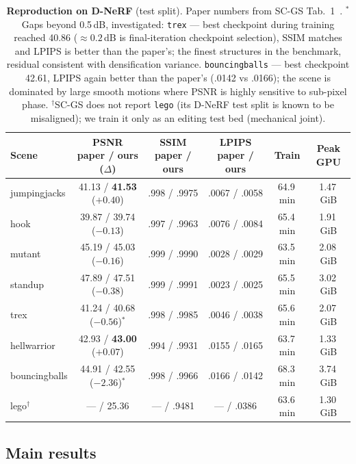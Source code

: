 \documentclass[10pt,twocolumn]{article}
\begin{document}
\begin{table}[t]
  \centering\small
  \caption{\textbf{Reproduction on D-NeRF} (test split). Paper numbers from
  SC-GS Tab.~1~\cite{scgs}. $^{*}$Gaps beyond 0.5\,dB, investigated:
  \texttt{trex} --- best checkpoint during training reached 40.86
  (${\approx}0.2$\,dB is final-iteration checkpoint selection), SSIM matches
  and LPIPS is better than the paper's; the finest structures in the benchmark,
  residual consistent with densification variance. \texttt{bouncingballs} ---
  best checkpoint 42.61, LPIPS again better than the paper's (.0142 vs .0166);
  the scene is dominated by large smooth motions where PSNR is highly sensitive
  to sub-pixel phase. $^{\dagger}$SC-GS does not report \texttt{lego} (its
  D-NeRF test split is known to be misaligned); we train it only as an editing
  test bed (mechanical joint).}
  \label{tab:repro}
  \setlength{\tabcolsep}{4.5pt}
  \begin{tabular}{lccccc}
    \toprule
    Scene & PSNR paper / ours ($\Delta$) & SSIM paper / ours & LPIPS paper / ours & Train & Peak GPU \\
    \midrule
    jumpingjacks & 41.13 / \textbf{41.53} ($+0.40$) & .998 / .9975 & .0067 / .0058 & 64.9\,min & 1.47\,GiB \\
    hook         & 39.87 / 39.74 ($-0.13$)          & .997 / .9963 & .0076 / .0084 & 65.4\,min & 1.91\,GiB \\
    mutant       & 45.19 / 45.03 ($-0.16$)          & .999 / .9990 & .0028 / .0029 & 63.5\,min & 2.08\,GiB \\
    standup      & 47.89 / 47.51 ($-0.38$)          & .999 / .9991 & .0023 / .0025 & 65.5\,min & 3.02\,GiB \\
    trex         & 41.24 / 40.68 ($-0.56$)$^{*}$    & .998 / .9985 & .0046 / .0038 & 65.6\,min & 2.07\,GiB \\
    hellwarrior  & 42.93 / \textbf{43.00} ($+0.07$) & .994 / .9931 & .0155 / .0165 & 63.7\,min & 1.33\,GiB \\
    bouncingballs& 44.91 / 42.55 ($-2.36$)$^{*}$    & .998 / .9966 & .0166 / .0142 & 68.3\,min & 3.74\,GiB \\
    lego$^{\dagger}$ & --- / 25.36                  & --- / .9481  & --- / .0386   & 63.6\,min & 1.30\,GiB \\
    \bottomrule
  \end{tabular}
\end{table}

\subsection{Main results}
\label{sec:main}
\end{document}
